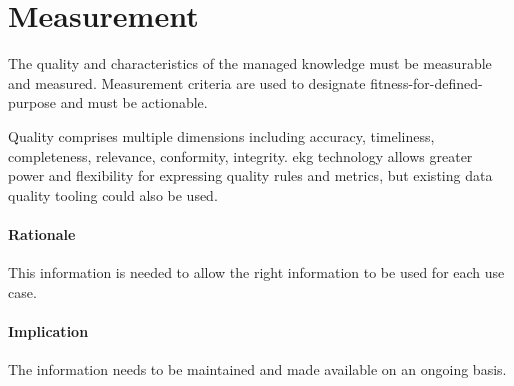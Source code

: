 \section{Measurement}\label{sec:ekg-principle-measurement}

The quality and characteristics of the managed knowledge must be measurable and measured. 
Measurement criteria are used to designate fitness-for-defined-purpose and must be actionable.

Quality comprises multiple dimensions including accuracy, timeliness, completeness, relevance, 
conformity, integrity. 
\Gls{ekg} technology allows greater power and flexibility for expressing quality rules and metrics, 
but existing data quality tooling could also be used.

\paragraph{Rationale}

This information is needed to allow the right information to be used for each use case.

\paragraph{Implication}

The information needs to be maintained and made available on an ongoing basis.
